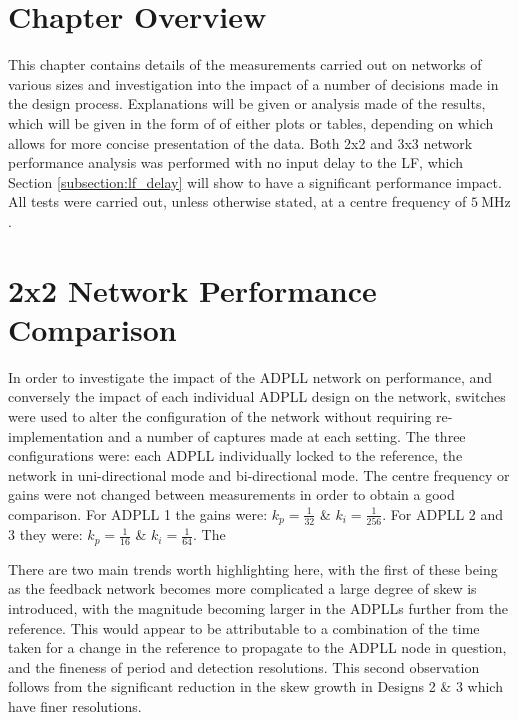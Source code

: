 \section{Chapter Overview}
This chapter contains details of the measurements carried out on networks of various sizes and investigation into the impact of a number of decisions made in the design process. Explanations will be given or analysis made of the results, which will be given in the form of of either plots or tables, depending on which allows for more concise presentation of the data. Both 2x2 and 3x3 network performance analysis was performed with no input delay to the \ac{LF}, which Section \ref{subsection:lf_delay} will show to have a significant performance impact. All tests were carried out, unless otherwise stated, at a centre frequency of $5~\si{\mega\hertz}$.

\section{2x2 Network Performance Comparison}
In order to investigate the impact of the \ac{ADPLL} network on performance, and conversely the impact of each individual \ac{ADPLL} design on the network, switches were used to alter the configuration of the network without requiring re-implementation and a number of captures made at each setting. The three configurations were: each \ac{ADPLL} individually locked to the reference, the network in uni-directional mode and bi-directional mode. The centre frequency or gains were not changed between measurements in order to obtain a good comparison. For \ac{ADPLL} 1 the gains were: $k_p = \frac{1}{32}$ \& $k_i = \frac{1}{256}$. For \ac{ADPLL} 2 and 3 they were: $k_p = \frac{1}{16}$ \& $k_i = \frac{1}{64}$. The

There are two main trends worth highlighting here, with the first of these being as the feedback network becomes more complicated a large degree of skew is introduced, with the magnitude becoming larger in the \ac{ADPLL}s further from the reference. This would appear to be attributable to a combination of the time taken for a change in the reference to propagate to the \ac{ADPLL} node in question, and the fineness of period and detection resolutions. This second observation follows from the significant reduction in the skew growth in Designs 2 \& 3 which have finer resolutions.

